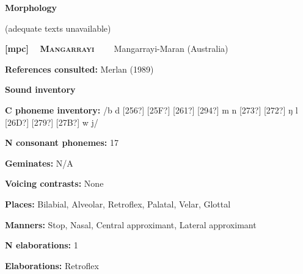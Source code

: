 \begin{styleBody}
\textbf{Morphology}
\end{styleBody}

\begin{styleBody}
(adequate texts unavailable)
\end{styleBody}

\clearpage\begin{styleBody}
\textbf{[mpc] }\ \ \textbf{\textsc{Mangarrayi\ \ }}\textbf{\ \ }Mangarrayi-Maran (Australia)
\end{styleBody}

\begin{styleBody}
\textbf{References consulted: }Merlan (1989)
\end{styleBody}

\begin{styleBody}
\textbf{Sound inventory}
\end{styleBody}

\begin{styleBody}
\textbf{C phoneme inventory:} /b d [256?] [25F?] [261?] [294?] m n [273?] [272?] ŋ l [26D?] [279?] [27B?] w j/
\end{styleBody}

\begin{styleBody}
\textbf{N consonant phonemes:} 17
\end{styleBody}

\begin{styleBody}
\textbf{Geminates:} N/A
\end{styleBody}

\begin{styleBody}
\textbf{Voicing contrasts:} None
\end{styleBody}

\begin{styleBody}
\textbf{Places:} Bilabial, Alveolar, Retroflex, Palatal, Velar, Glottal
\end{styleBody}

\begin{styleBody}
\textbf{Manners:} Stop, Nasal, Central approximant, Lateral approximant
\end{styleBody}

\begin{styleBody}
\textbf{N elaborations:} 1
\end{styleBody}

\begin{styleBody}
\textbf{Elaborations:} Retroflex
\end{styleBody}

